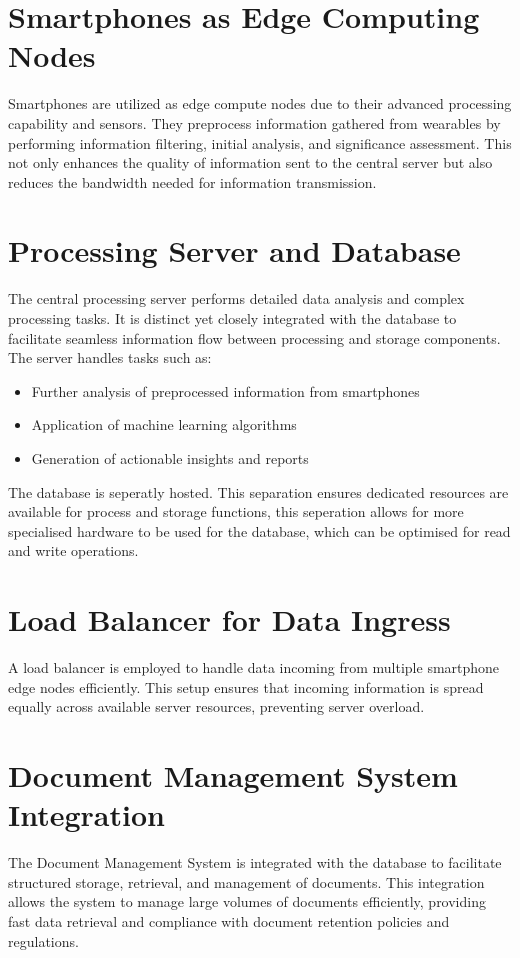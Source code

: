 \section{Smartphones as Edge Computing Nodes}
Smartphones are utilized as edge compute nodes due to their advanced processing
capability and sensors. They preprocess information gathered from wearables by
performing information filtering, initial analysis, and significance
assessment. This not only enhances the quality of information sent to the
central server but also reduces the bandwidth needed for information
transmission.

\section{Processing Server and Database}
The central processing server performs detailed data analysis and complex
processing tasks. It is distinct yet closely integrated with the database to
facilitate seamless information flow between processing and storage components.
The server handles tasks such as:

\begin{itemize}
    \item Further analysis of preprocessed information from smartphones
    \item Application of machine learning algorithms
    \item Generation of actionable insights and reports
\end{itemize}

The database is seperatly hosted. This separation ensures dedicated resources
are available for process and storage functions, this seperation allows for more
specialised hardware to be used for the database, which can be optimised for
read and write operations.

\section{Load Balancer for Data Ingress}
A load balancer is employed to handle data incoming from multiple smartphone
edge nodes efficiently. This setup ensures that incoming information is spread
equally across available server resources, preventing server overload.

\section{Document Management System Integration}
The Document Management System is integrated with the database to facilitate
structured storage, retrieval, and management of documents. This integration
allows the system to manage large volumes of documents efficiently, providing
fast data retrieval and compliance with document retention policies and
regulations.

